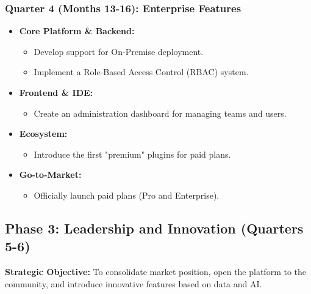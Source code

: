\documentclass[11pt, a4paper, oneside]{article}
\begin{document}
\subsubsection*{Quarter 4 (Months 13-16): Enterprise Features}
\begin{itemize}[leftmargin=*]
    \item \textbf{Core Platform \& Backend:}
    \begin{itemize}
        \item Develop support for On-Premise deployment.
        \item Implement a Role-Based Access Control (RBAC) system.
    \end{itemize}
    \item \textbf{Frontend \& IDE:}
    \begin{itemize}
        \item Create an administration dashboard for managing teams and users.
    \end{itemize}
    \item \textbf{Ecosystem:}
    \begin{itemize}
        \item Introduce the first "premium" plugins for paid plans.
    \end{itemize}
    \item \textbf{Go-to-Market:}
    \begin{itemize}
        \item Officially launch paid plans (Pro and Enterprise).
    \end{itemize}
\end{itemize}

\clearpage

\subsection{Phase 3: Leadership and Innovation (Quarters 5-6)}
\textbf{Strategic Objective:} To consolidate market position, open the platform to the community, and introduce innovative features based on data and AI.
\end{document}
